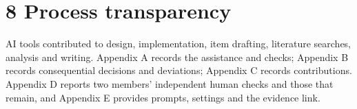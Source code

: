 \section{8 Process transparency}
AI tools contributed to design, implementation, item drafting, literature searches, analysis and writing. Appendix A records the assistance and checks; Appendix B records consequential decisions and deviations; Appendix C records contributions. Appendix D reports two members' independent human checks and those that remain, and Appendix E provides prompts, settings and the evidence link.
